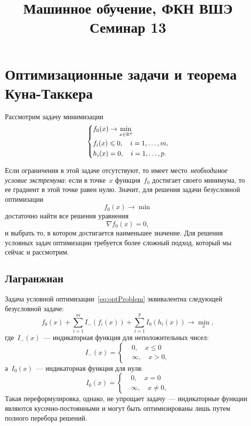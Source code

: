 \documentclass[12pt,fleqn]{article}
\begin{document}
\title{Машинное обучение, ФКН ВШЭ\\Семинар 13}
\author{}
\maketitle

\section{Оптимизационные задачи и теорема Куна-Таккера}

Рассмотрим задачу минимизации
\begin{equation}
\label{eq:optProblem}
    \left\{
        \begin{aligned}
            & f_0(x) \to \min_{x \in \mathbb{R}^d} \\
            & f_i(x) \leqslant 0, \quad i = 1, \dots, m, \\
            & h_i(x) = 0, \quad i = 1, \dots, p.
        \end{aligned}
    \right.
\end{equation}

Если ограничения в этой задаче отсутствуют,
то имеет место~\emph{необходимое условие экстремума}:
если в точке~$x$ функция~$f_0$ достигает своего минимума,
то ее градиент в этой точке равен нулю.
Значит, для решения задачи безусловной оптимизации
\[
    f_0(x) \to \min
\]
достаточно найти все решения уравнения
\[
    \nabla f_0(x) = 0,
\]
и выбрать то, в котором достигается наименьшее значение.
Для решения условных задач оптимизации требуется более сложный подход,
который мы сейчас и рассмотрим.

\subsection{Лагранжиан}
Задача условной оптимизации~\eqref{eq:optProblem} эквивалентна
следующей безусловной задаче:
\[
    f_0(x)
    +
    \sum_{i = 1}^{m} I_{-}(f_i(x))
    +
    \sum_{i = 1}^{p} I_{0}(h_i(x))
    \to
    \min_{x},
\]
где~$I_{-}(x)$~--- индикаторная функция для неположительных чисел:
\[
    I_{-}(x)
    =
    \left\{
        \begin{aligned}
            &0, \quad x \leq 0 \\
            &\infty, \quad x > 0,
        \end{aligned}
    \right.
\]
а~$I_{0}(x)$~--- индикаторная функция для нуля:
\[
    I_{0}(x)
    =
    \left\{
        \begin{aligned}
            &0, \quad x = 0 \\
            &\infty, \quad x \neq 0,
        \end{aligned}
    \right.
\]
Такая переформулировка, однако, не упрощает задачу~--- индикаторные
функции являются кусочно-постоянными и могут быть оптимизированы
лишь путем полного перебора решений.
\end{document}
